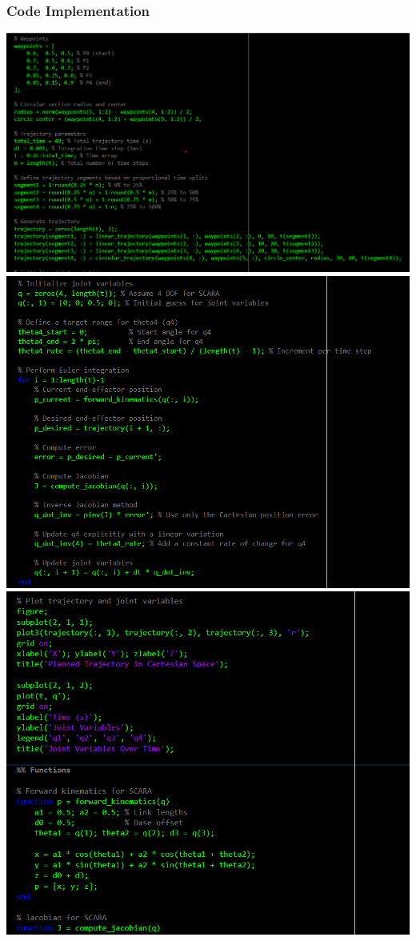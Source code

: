 \documentclass[12pt]{report}
\begin{document}
			\subsubsection{Code Implementation}
		\includegraphics[scale = 0.72]{C1}
		\includegraphics[scale = 0.73]{C2}
		\\
		\includegraphics[scale = 0.72]{C3}
\end{document}
